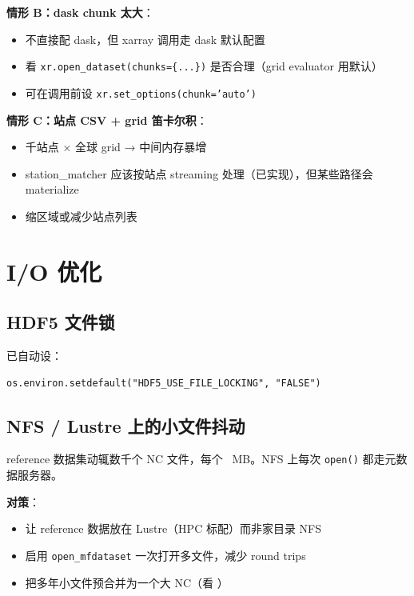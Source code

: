 \textbf{情形 B：dask chunk 太大}：
\begin{itemize}
  \item \openbench{} 不直接配 dask，但 xarray 调用走 dask 默认配置
  \item 看 \texttt{xr.open\_dataset(chunks=\{...\})} 是否合理（grid evaluator 用默认）
  \item 可在调用前设 \texttt{xr.set\_options(chunk='auto')}
\end{itemize}

\textbf{情形 C：站点 CSV + grid 笛卡尔积}：
\begin{itemize}
  \item 千站点 × 全球 grid → 中间内存暴增
  \item station\_matcher 应该按站点 streaming 处理（已实现），但某些路径会 materialize
  \item 缩区域或减少站点列表
\end{itemize}

\section{I/O 优化}

\subsection{HDF5 文件锁}

\openbench{} 已自动设：

\begin{verbatim}
os.environ.setdefault("HDF5_USE_FILE_LOCKING", "FALSE")
\end{verbatim}


\subsection{NFS / Lustre 上的小文件抖动}

reference 数据集动辄数千个 NC 文件，每个 ~MB。NFS 上每次 \texttt{open()} 都走元数据服务器。

\textbf{对策}：

\begin{itemize}
  \item 让 reference 数据放在 Lustre（HPC 标配）而非家目录 NFS
  \item 启用 \texttt{open\_mfdataset} 一次打开多文件，减少 round trips
  \item 把多年小文件预合并为一个大 NC（看 ）
\end{itemize}

